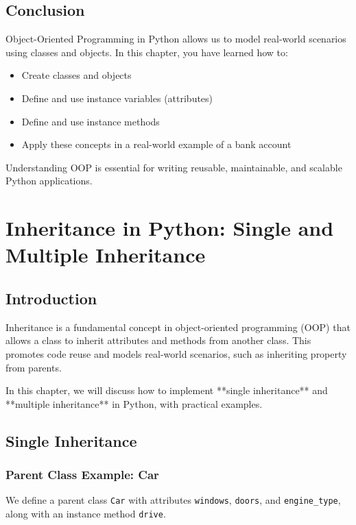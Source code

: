 \section{Conclusion}

Object-Oriented Programming in Python allows us to model real-world scenarios using classes and objects. In this chapter, you have learned how to:

\begin{itemize}
    \item Create classes and objects
    \item Define and use instance variables (attributes)
    \item Define and use instance methods
    \item Apply these concepts in a real-world example of a bank account
\end{itemize}

Understanding OOP is essential for writing reusable, maintainable, and scalable Python applications. 


\chapter{Inheritance in Python: Single and Multiple Inheritance}

\section{Introduction}

Inheritance is a fundamental concept in object-oriented programming (OOP) that allows a class to inherit attributes and methods from another class. This promotes code reuse and models real-world scenarios, such as inheriting property from parents.

In this chapter, we will discuss how to implement **single inheritance** and **multiple inheritance** in Python, with practical examples.

\section{Single Inheritance}

\subsection{Parent Class Example: Car}

We define a parent class \texttt{Car} with attributes \texttt{windows}, \texttt{doors}, and \texttt{engine\_type}, along with an instance method \texttt{drive}.

